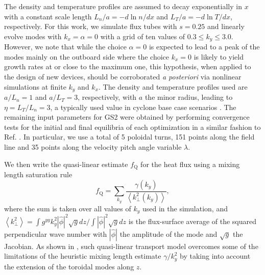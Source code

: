 \documentclass[prl,twocolumn,amsmath,amssymb,showpacs,superscriptaddress]{revtex4-2}
\begin{document}
The density and temperature profiles are assumed to decay exponentially in $x$ with a constant scale length $L_{n}/a= - d \ln n/d x$ and $L_{T}/a= - d \ln T/d x$, respectively.
%
For this work, we simulate flux tubes with $s=0.25$ and linearly evolve modes with $k_x=\alpha=0$ with a grid of ten values of $0.3\le k_y\le 3.0$.
%
However, we note that while the choice $\alpha=0$ is expected to lead to a peak of the modes mainly on the outboard side \cite{Plunk2014} where the choice $k_x=0$ is likely to yield growth rates at or close to the maximum one, this hypothesis{, when applied to the design of new devices, should be} corroborated \textit{a posteriori} via nonlinear simulations at finite $k_y$ and $k_x$.
%
The density and temperature profiles used are $a/L_n=1$ and $a/L_T=3$, respectively, with $a$ the minor radius, leading to $\eta = L_T/L_n=3$, a typically used value in cyclone base case scenarios \cite{Dimits2000}.
%
The remaining input parameters for GS2 were obtained by performing convergence tests for the initial and final equilibria of each optimization in a similar fashion to Ref. \cite{Jorge2021}.
%
{In particular, we use a total of 5 poloidal turns, 151 points along the field line and 35 points along the velocity pitch angle variable $\lambda$.}

We then write the quasi-linear estimate $f_\text{Q}$ for the heat flux using a mixing length saturation rule \cite{Mariani2018}
%
\begin{equation}
    f_{\text{Q}}=\sum_{k_y}\frac{\gamma(k_y)}{\left<k_\perp^2{(k_y)}\right>},
\label{eq:quasilineareq}
\end{equation}
%
where the sum is taken over all values of $k_y$ used in the simulation, and $\left<k_\perp^2\right>=\int g^{yy}k_y^2 |\hat{\phi}|^2 \sqrt{g} dz/\int |\hat{\phi}|^2 \sqrt{g} dz$ is the flux-surface average of the squared perpendicular wave number with $|\hat{\phi}|$ the amplitude of the mode and $\sqrt{g}$ the Jacobian.
%
As shown in \cite{Jenko2005}, such quasi-linear transport model overcomes some of the limitations of the heuristic mixing length estimate $\gamma/k_y^2$ by taking into account the extension of the toroidal modes along $z$.
\end{document}
